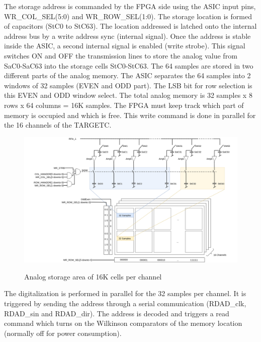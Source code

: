 \noindent
The storage address is commanded by the FPGA side using the ASIC input pins, WR\_COL\_SEL(5:0) and WR\_ROW\_SEL(1:0). The storage location is formed of capacitors (StC0 to StC63). The location addressed is latched onto the internal address bus by a write address sync (internal signal). Once the address is stable inside the ASIC, a second internal signal is enabled (write strobe). This signal switches ON and OFF the transmission lines to store the analog value from SaC0-SaC63 into the storage cells StC0-StC63. The 64 samples are stored in two different parts of the analog memory. The ASIC separates the 64 samples into 2 windows of 32 samples (EVEN and ODD part). The LSB bit for row selection is this EVEN and ODD window select. The total analog memory is 32 samples x 8 rows x 64 columns = 16K samples. The FPGA must keep track which part of memory is occupied and which is free. This write command is done in parallel for the 16 channels of the TARGETC.

\begin{figure}[H]
\centering
\includegraphics[width=1\textwidth]{figures/storagearea2.png}\\
\caption{\label{fig:storagearea} Analog storage area of 16K cells per channel}
\end{figure}

\noindent
The digitalization is performed in parallel for the 32 samples per channel. It is triggered by sending the address through a serial communication (RDAD\_clk, RDAD\_sin and RDAD\_dir). The address is decoded and triggers a read command which turns on the Wilkinson comparators of the memory location (normally off for power consumption).

